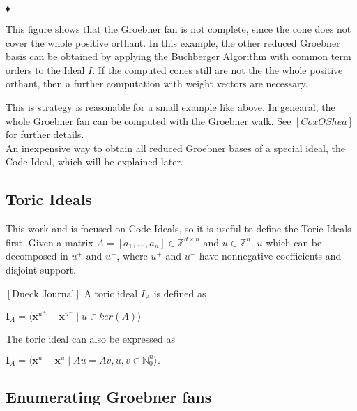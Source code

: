 \begin{flushright}
$\blacklozenge$
\end{flushright} 

This figure shows that the Groebner fan is not complete, since the cone does not cover the whole positive orthant. In this example, the other reduced Groebner basis can be obtained by applying the Buchberger Algorithm with common term orders to the Ideal $I$.
If the computed cones still are not the the whole positive orthant, then a further computation with weight vectors are necessary.

This is strategy is reasonable for a small example like above.
In genearal, the whole Groebner fan can be computed with the Groebner walk.
See $\left[ Cox OShea \right]$ for further details.\\
An inexpensive way to obtain all reduced Groebner bases of a special ideal, the Code Ideal, which will be explained later.

\subsection{Toric Ideals}
This work and is focused on Code Ideals, so it is useful to define the Toric Ideals first. Given a matrix $A =\left[a_{1},\dots, a_{n}  \right] \in \mathbb{Z}^{d \times n } $ and $u \in \mathbb{Z}^{n}$. $u$ which can be decomposed in $u^{+} $ and $u^{-}$, where $u^{+} $ and $u^{-}$ have nonnegative coefficients and disjoint support.

\begin{env_definition}
$\left[ \textrm{Dueck Journal} \right] $ A toric ideal $I_{A}$ is defined as
\begin{center}
$ \textbf{I}_{A} = \langle \textbf{x}^{u^{+}} - \textbf{x}^{u^{-}} \mid u \in ker \left(  A \right) \rangle  $
\end{center}


\end{env_definition}

The toric ideal can also be expressed as
\begin{center}
$ \textbf{I}_{A} =  \langle \textbf{x}^{u} - \textbf{x}^{u} \mid Au = Av, u,v \in \mathbb{N}^{n}_{0} \rangle .$
\end{center}



\subsection{Enumerating Groebner fans}

